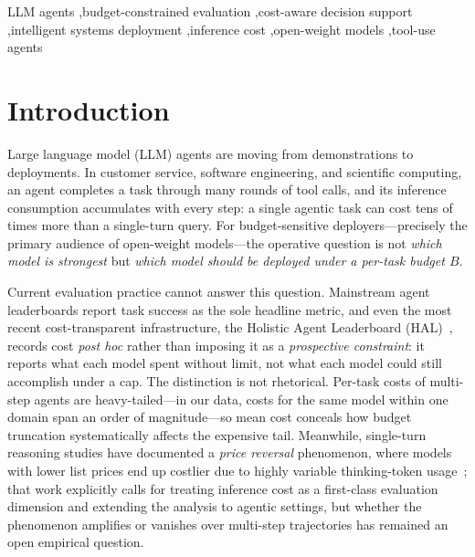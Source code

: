 \documentclass[preprint,authoryear,12pt]{elsarticle}
\begin{document}
\begin{frontmatter}
\begin{keyword}
LLM agents \sep budget-constrained evaluation \sep cost-aware decision support \sep intelligent systems deployment \sep inference cost \sep open-weight models \sep tool-use agents
\end{keyword}

\end{frontmatter}

\section{Introduction}
\label{sec:introduction}
Large language model (LLM) agents are moving from demonstrations to deployments. In customer service, software engineering, and scientific computing, an agent completes a task through many rounds of tool calls, and its inference consumption accumulates with every step: a single agentic task can cost tens of times more than a single-turn query. For budget-sensitive deployers---precisely the primary audience of open-weight models---the operative question is not \emph{which model is strongest} but \emph{which model should be deployed under a per-task budget $B$}.

Current evaluation practice cannot answer this question. Mainstream agent leaderboards report task success as the sole headline metric, and even the most recent cost-transparent infrastructure, the Holistic Agent Leaderboard (HAL)~\cite{kapoor2025holisticagentleaderboard}, records cost \emph{post hoc} rather than imposing it as a \emph{prospective constraint}: it reports what each model spent without limit, not what each model could still accomplish under a cap. The distinction is not rhetorical. Per-task costs of multi-step agents are heavy-tailed---in our data, costs for the same model within one domain span an order of magnitude---so mean cost conceals how budget truncation systematically affects the expensive tail. Meanwhile, single-turn reasoning studies have documented a \emph{price reversal} phenomenon, where models with lower list prices end up costlier due to highly variable thinking-token usage~\cite{chen2026pricereversal}; that work explicitly calls for treating inference cost as a first-class evaluation dimension and extending the analysis to agentic settings, but whether the phenomenon amplifies or vanishes over multi-step trajectories has remained an open empirical question.
\end{document}
